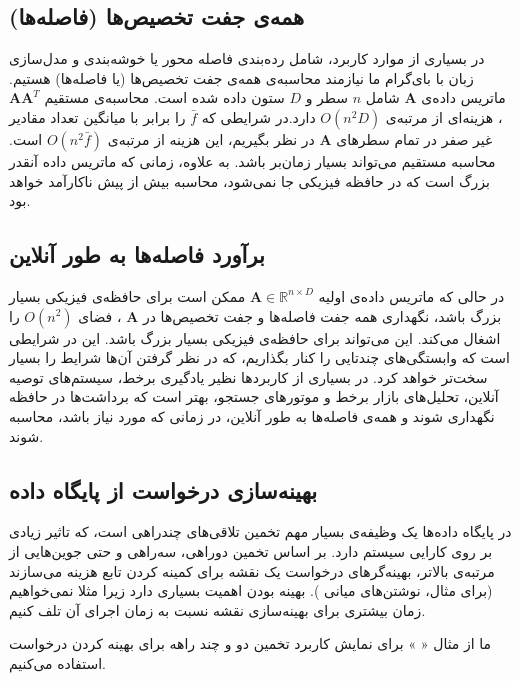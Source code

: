\subsection{
همه‌ی جفت تخصیص‌ها (فاصله‌ها)
}
در بسیاری از موارد کاربرد، شامل رده‌بندی فاصله محور یا خوشه‌بندی و مدل‌سازی زبان با بای‌گرام%
\cite{litez48}
ما نیازمند محاسبه‌ی همه‌ی جفت تخصیص‌ها (یا فاصله‌ها) هستیم. ماتریس داده‌ی 
$\mathbf{A}$
شامل 
$n$
سطر و 
$D$
ستون داده شده است. محاسبه‌ی مستقیم
$\mathbf{AA}^T$
، هزینه‌ای از مرتبه‌ی 
$O(n^2 D)$
دارد.در شرایطی که 
$\bar{f}$
را 
برابر با میانگین تعداد مقادیر غیر صفر در تمام سطرهای 
‌$\mathbf{A}$
در نظر بگیریم، 
این هزینه از مرتبه‌ی 
$O(n^2 \bar{f})$
است. محاسبه مستقیم می‌تواند بسیار زمان‌بر باشد. به علاوه، زمانی که ماتریس داده آنقدر بزرگ است که در حافظه فیزیکی جا نمی‌شود، محاسبه بیش از پیش ناکارآمد خواهد بود.


\subsection{
برآورد فاصله‌ها به طور آنلاین
}

در حالی که ماتریس داده‌ی اولیه 
$\mathbf{A} \in \mathbb{R}^{n \times D}$
ممکن است برای حافظه‌ی فیزیکی بسیار بزرگ باشد، نگهداری%
همه جفت فاصله‌ها و جفت تخصیص‌ها در 
$\mathbf{A}$
، فضای 
$O(n^2)$
را اشغال می‌کند. این می‌تواند برای حافظه‌ی فیزیکی بسیار بزرگ باشد. این در شرایطی است که وابستگی‌های چندتایی را کنار بگذاریم، که در نظر گرفتن ‌آن‌ها شرایط را بسیار سخت‌تر خواهد کرد. در بسیاری از کاربردها نظیر یادگیری برخط، سیستم‌های توصیه آنلاین، تحلیل‌های بازار برخط و موتورهای جستجو، بهتر است که برداشت‌ها%
در حافظه نگهداری شوند و همه‌ی فاصله‌ها به طور آنلاین، در زمانی که مورد نیاز باشد، محاسبه شوند.

\subsection{
بهینه‌سازی درخواست از پایگاه داده
}

در پایگاه داده‌ها یک وظیفه‌ی بسیار مهم تخمین تلاقی‌های%
چندراهی است، که تاثیر زیادی بر روی کارایی سیستم دارد.
\cite{litez81}
بر اساس تخمین دوراهی، سه‌راهی و حتی جوین‌هایی از مرتبه‌ی بالاتر، بهینه‌گرهای درخواست یک نقشه برای کمینه کردن تابع هزینه می‌سازند (برای مثال، نوشتن‌های میانی%
). بهینه بودن اهمیت بسیاری دارد زیرا مثلا نمی‌خواهیم زمان بیشتری برای بهینه‌سازی نقشه نسبت به زمان اجرای آن تلف کنیم.

ما از مثال «%
%
» برای نمایش کاربرد تخمین دو و چند راهه برای بهینه کردن درخواست استفاده می‌کنیم.

